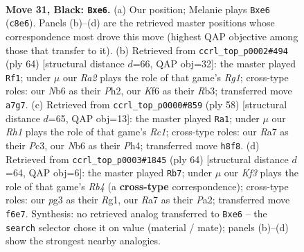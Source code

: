 \documentclass[11pt]{article}
\begin{document}
\clearpage

\begin{figure}[p]\centering
\begin{subfigure}{0.46\textwidth}\centering
\resizebox{\linewidth}{!}{%
\newchessgame
\chessboard[
  setfen={2b4r/r7/pnB1Pkp1/p4pNp/5B2/P4PP1/1P5P/RK1R4 b - - 0 31},
  showmover=false,
  pgfstyle=straightmove, color=movearrow, markmove={c8-e6}
]}
\caption{}
\end{subfigure}\hfill
\begin{subfigure}{0.46\textwidth}\centering
\resizebox{\linewidth}{!}{%
\newchessgame
\chessboard[
  setfen={3r1bk1/5p2/pp5r/2p3p1/PnN3P1/1RB1P2p/1P2KP1P/6R1 w - - 1 33},
  showmover=false,
  pgfstyle=straightmove, color=movearrow, markmove={g1-f1}
]}
\caption{}
\end{subfigure}
\\[4pt]
\begin{subfigure}{0.46\textwidth}\centering
\resizebox{\linewidth}{!}{%
\newchessgame
\chessboard[
  setfen={2r2r2/5ppk/4pn1p/1R1b4/2pP3P/2P2PB1/6P1/2R2BK1 w - - 1 30},
  showmover=false,
  pgfstyle=straightmove, color=movearrow, markmove={c1-a1}
]}
\caption{}
\end{subfigure}\hfill
\begin{subfigure}{0.46\textwidth}\centering
\resizebox{\linewidth}{!}{%
\newchessgame
\chessboard[
  setfen={r3r1k1/5ppp/2p3b1/2NpB1P1/pR1P3P/2K1nP2/P7/6R1 w - - 4 33},
  showmover=false,
  pgfstyle=straightmove, color=movearrow, markmove={b4-b7}
]}
\caption{}
\end{subfigure}
\caption{\textbf{Move 31, Black: \texttt{Bxe6}.} (a) Our position; Melanie plays \texttt{Bxe6} (\texttt{c8e6}). Panels (b)--(d) are the retrieved master positions whose correspondence most drove this move (highest QAP objective among those that transfer to it). (b) Retrieved from \texttt{ccrl\_top\_p0002\#494} (ply 64) [structural distance $d$=66, QAP obj=32]: the master played \texttt{Rf1}; under $\mu$ our \emph{Ra2} plays the role of that game's \emph{Rg1}; cross-type roles: our \emph{N}b6 as their \emph{P}h2, our \emph{K}f6 as their \emph{R}b3; transferred move \texttt{a7g7}. (c) Retrieved from \texttt{ccrl\_top\_p0000\#859} (ply 58) [structural distance $d$=65, QAP obj=13]: the master played \texttt{Ra1}; under $\mu$ our \emph{Rh1} plays the role of that game's \emph{Rc1}; cross-type roles: our \emph{R}a7 as their \emph{P}c3, our \emph{N}b6 as their \emph{P}h4; transferred move \texttt{h8f8}. (d) Retrieved from \texttt{ccrl\_top\_p0003\#1845} (ply 64) [structural distance $d$=64, QAP obj=6]: the master played \texttt{Rb7}; under $\mu$ our \emph{Kf3} plays the role of that game's \emph{Rb4} (a \textbf{cross-type} correspondence); cross-type roles: our \emph{p}g3 as their \emph{R}g1, our \emph{R}a7 as their \emph{P}a2; transferred move \texttt{f6e7}. Synthesis: no retrieved analog transferred to \texttt{Bxe6} -- the \texttt{search} selector chose it on value (material / mate); panels (b)--(d) show the strongest nearby analogies.}
\label{fig:thought-m61}
\end{figure}
\end{document}
